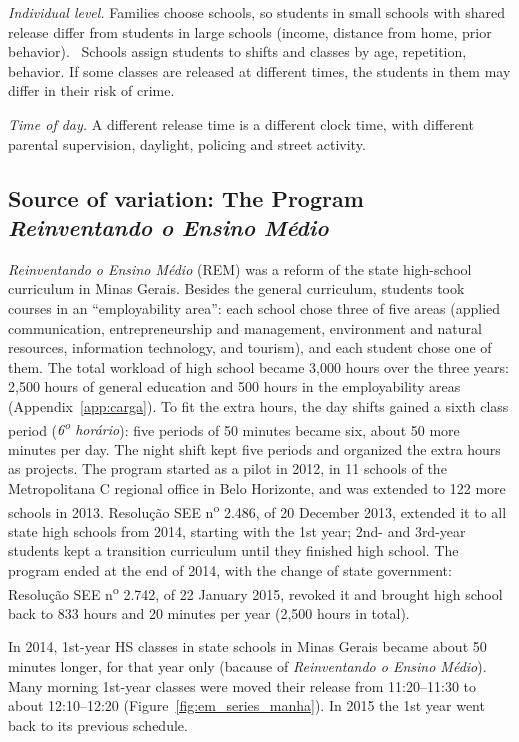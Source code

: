 \documentclass[11pt]{article}
\begin{document}
\emph{Individual level.}   Families choose schools, so students in
        small schools with shared release differ from students in large
        schools (income, distance from home, prior behavior).
  \ Schools assign students to
        shifts and classes by age, repetition, behavior. If
        some classes are released at different times, the students in them may
        differ in their risk of crime.

\emph{Time of day.} A different release time is a different clock time, with
different parental supervision, daylight, policing and street activity.

\subsection{Source of variation: The Program \emph{Reinventando o Ensino M\'edio}}

\emph{Reinventando o Ensino M\'edio} (REM) was a reform of the state
high-school curriculum in Minas Gerais. Besides the general curriculum,
students took courses in an ``employability area'': each school chose three of
five areas (applied communication, entrepreneurship and management, environment
and natural resources, information technology, and tourism), and each student
chose one of them. The total workload of high school became 3,000 hours over the
three years: 2,500 hours of general education and 500 hours in the
employability areas (Appendix~\ref{app:carga}). To fit the extra hours, the day shifts gained a sixth class
period (\emph{6\textsuperscript{o} hor\'ario}): five periods of 50 minutes
became six, about 50 more minutes per day. The night shift kept five periods and
organized the extra hours as projects. The program started as a pilot in 2012,
in 11 schools of the Metropolitana C regional office in Belo Horizonte, and was
extended to 122 more schools in 2013. Resolu\c{c}\~ao SEE n\textsuperscript{o}
2.486, of 20 December 2013, extended it to all state high schools from 2014,
starting with the 1st year; 2nd- and 3rd-year students kept a transition
curriculum until they finished high school. The program ended at the end of
2014, with the change of state government: Resolu\c{c}\~ao SEE
n\textsuperscript{o} 2.742, of 22 January 2015, revoked it and brought high
school back to 833 hours and 20 minutes per year (2,500 hours in total).

In 2014, 1st-year HS classes in state schools in Minas Gerais became about
50 minutes longer, for that year only (bacause of
\emph{Reinventando o Ensino M\'edio}). Many morning 1st-year classes were
moved their release from 11:20--11:30 to about 12:10--12:20
(Figure~\ref{fig:em_series_manha}).
 In 2015 the 1st year went back to its previous schedule.
\end{document}
